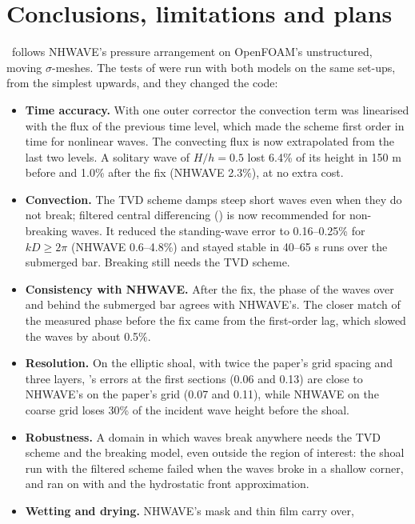\section{Conclusions, limitations and plans}
\label{sec:conclusions}

\NHFOAM\ follows NHWAVE's pressure arrangement on OpenFOAM's unstructured,
moving $\sigma$-meshes. The tests of \citet{ma2012} were run with both models
on the same set-ups, from the simplest upwards, and they changed the code:
\begin{itemize}[nosep]
  \item \textbf{Time accuracy.} With one outer corrector the convection term
        was linearised with the flux of the previous time level, which made the
        scheme first order in time for nonlinear waves. The convecting flux is
        now extrapolated from the last two levels. A solitary wave of
        $H/h=0.5$ lost 6.4\% of its height in 150 m before and 1.0\% after the
        fix (NHWAVE 2.3\%), at no extra cost.
  \item \textbf{Convection.} The TVD scheme damps steep short waves even when
        they do not break; filtered central differencing
        () is now recommended for non-breaking
        waves. It reduced the standing-wave error to 0.16--0.25\% for
        $kD\ge 2\pi$ (NHWAVE 0.6--4.8\%) and stayed stable in 40--65 s runs over
        the submerged bar. Breaking still needs the TVD scheme.
  \item \textbf{Consistency with NHWAVE.} After the fix, the phase of the waves
        over and behind the submerged bar agrees with NHWAVE's. The closer
        match of the measured phase before the fix came from the first-order
        lag, which slowed the waves by about 0.5\%.
  \item \textbf{Resolution.} On the elliptic shoal, with twice the paper's
        grid spacing and three layers, \NHFOAM's errors at the first sections
        (0.06 and 0.13) are close to NHWAVE's on the paper's grid (0.07 and
        0.11), while NHWAVE on the coarse grid loses 30\% of the incident wave
        height before the shoal.
  \item \textbf{Robustness.} A domain in which waves break anywhere needs the
        TVD scheme and the breaking model, even outside the region of
        interest: the shoal run with the filtered scheme failed when the waves
        broke in a shallow corner, and ran on with  and
        the hydrostatic front approximation.
  \item \textbf{Wetting and drying.} NHWAVE's mask and thin film carry over,

\end{itemize}
